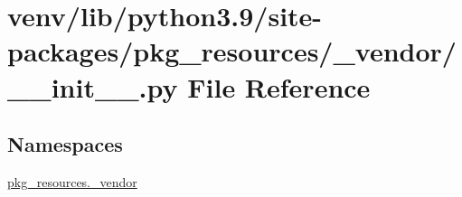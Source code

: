 \hypertarget{venv_2lib_2python3_89_2site-packages_2pkg__resources_2__vendor_2____init_____8py}{}\section{venv/lib/python3.9/site-\/packages/pkg\+\_\+resources/\+\_\+vendor/\+\_\+\+\_\+init\+\_\+\+\_\+.py File Reference}
\label{venv_2lib_2python3_89_2site-packages_2pkg__resources_2__vendor_2____init_____8py}
\subsection*{Namespaces}
\begin{DoxyCompactItemize}
\item 
 \hyperlink{namespacepkg__resources_1_1__vendor}{pkg\+\_\+resources.\+\_\+vendor}
\end{DoxyCompactItemize}
